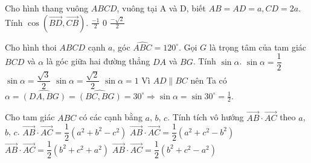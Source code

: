 \begin{ex}%
	Cho hình thang vuông $ABCD$, vuông tại A và D, biết $AB=AD=a, CD=2a$. Tính $\cos \left(\overrightarrow{BD},\overrightarrow{CB}\right)$.
	{$\displaystyle \frac{-1}{2}$}
	{\True$0$}
	{$\displaystyle \frac{-\sqrt{2}}{2}$}
\end{ex}

\begin{ex}%
	Cho hình thoi $ABCD$ cạnh $a$, góc $\widehat {ABC}=120^\circ $. Gọi $G$ là trọng tâm của tam giác $BCD$ và $\alpha $ là góc giữa hai đường thẳng $DA$ và $BG$. Tính $\sin \alpha $. 
	\choice
	{\True $\sin \alpha =\dfrac {1}{2} $} 
	{$\sin \alpha =\dfrac {\sqrt{3}}{2} $} 
	{$\sin \alpha =\dfrac {\sqrt{2}}{2} $} 
	{$\sin \alpha =1 $}
	\loigiai 
	{Vì $AD\parallel BC$ nên Ta có
		$\alpha =\widehat {\left(DA,BG\right)}=\widehat {\left(BC,BG\right)}=30^\circ \Rightarrow \sin \alpha =\sin 30^\circ =\frac{1}{2}.$}
\end{ex}



\begin{ex}%
	Cho tam giác $ABC$ có các cạnh bằng $a$, $b$, $c$. Tính tích vô hướng $\overrightarrow{AB}\cdot \overrightarrow{AC}$ theo $a$, $b$, $c$.
	\choice
	{$\overrightarrow{AB}\cdot \overrightarrow{AC}=\dfrac{1}{2}(a^2+b^2-c^2)$}
	{$\overrightarrow{AB}\cdot \overrightarrow{AC}=\dfrac{1}{2}(a^2+c^2-b^2)$}
	{$\overrightarrow{AB}\cdot \overrightarrow{AC}=\dfrac{1}{2}(b^2+c^2+a^2)$}
	{\True $\overrightarrow{AB}\cdot \overrightarrow{AC}=\dfrac{1}{2}(b^2+c^2-a^2)$}
\end{ex}

